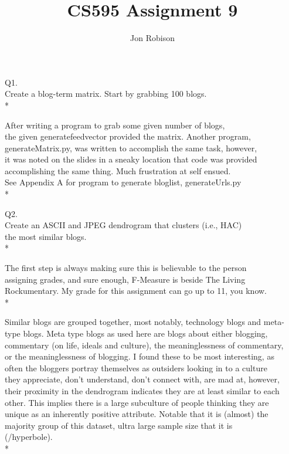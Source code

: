 \documentclass{article}
\begin{document}
\author{Jon Robison}
\title{CS595 Assignment 9}
\maketitle

Q1.\\
Create a blog-term matrix. Start by grabbing 100 blogs.\\*

After writing a program to grab some given number of blogs,\\
the given generatefeedvector provided the matrix. Another program,\\
generateMatrix.py, was written to accomplish the same task, however,\\
it was noted on the slides in a sneaky location that code was provided\\
accomplishing the same thing. Much frustration at self ensued.\\
See Appendix A for program to generate bloglist, generateUrls.py\\*

Q2.\\
Create an ASCII and JPEG dendrogram that clusters (i.e., HAC)\\
the most similar blogs.\\*

The first step is always making sure this is believable to the person \\
assigning grades, and sure enough, F-Measure is beside The Living \\
Rockumentary. My grade for this assignment can go up to 11, you know.\\*

Similar blogs are grouped together, most notably, technology blogs and meta-\\
type blogs. Meta type blogs as used here are blogs about either blogging,\\
commentary (on life, ideals and culture), the meaninglessness of commentary,\\
or the meaninglessness of blogging. I found these to be most interesting, as\\
often the bloggers portray themselves as outsiders looking in to a culture\\
they appreciate, don't understand, don't connect with, are mad at, however,\\
their proximity in the dendrogram indicates they are at least similar to each\\
other. This implies there is a large subculture of people thinking they are\\
unique as an inherently positive attribute. Notable that it is (almost) the\\
majority group of this dataset, ultra large sample size that it is\\
(/hyperbole).\\*
\end{document}
